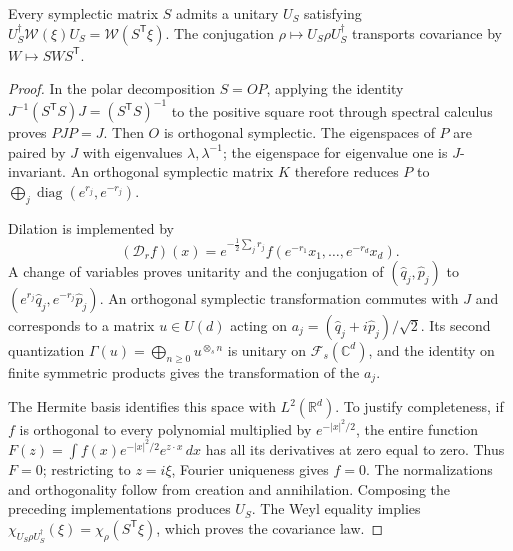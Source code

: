 \begin{lemma}
\label{md:antmem:gauss:lem:implementacion-simplectica}
Every symplectic matrix \(S\) admits a unitary \(U_S\) satisfying
\(U_S^\dagger\mathcal W(\xi)U_S=\mathcal W(S^{\mathsf T}\xi)\).
The conjugation \(\rho\mapsto U_S\rho U_S^\dagger\) transports
covariance by \(W\mapsto SWS^{\mathsf T}\).
\end{lemma}
\begin{proof}
In the polar decomposition \(S=OP\), applying the identity
\(J^{-1}(S^{\mathsf T}S)J=(S^{\mathsf T}S)^{-1}\) to the positive square root
through spectral calculus proves \(PJP=J\).
Then \(O\) is orthogonal symplectic. The eigenspaces of \(P\)
are paired by \(J\) with eigenvalues \(\lambda,\lambda^{-1}\);
the eigenspace for eigenvalue one is \(J\)-invariant. An
orthogonal symplectic matrix \(K\) therefore reduces \(P\) to
\(\bigoplus_j\operatorname{diag}(e^{r_j},e^{-r_j})\).

Dilation is implemented by
\[
 (\mathcal D_rf)(x)=e^{-\frac12\sum_jr_j}
 f(e^{-r_1}x_1,\ldots,e^{-r_d}x_d).
\]
A change of variables proves unitarity and the conjugation of
\((\widehat q_j,\widehat p_j)\) to
\((e^{r_j}\widehat q_j,e^{-r_j}\widehat p_j)\).
An orthogonal symplectic transformation commutes with \(J\) and
corresponds to a matrix \(u\in U(d)\) acting on
\(a_j=(\widehat q_j+i\widehat p_j)/\sqrt2\). Its second
quantization \(\Gamma(u)=\bigoplus_{n\geq0}u^{\otimes_s n}\)
is unitary on \(\mathcal F_s(\mathbb C^d)\), and the identity on
finite symmetric products gives the transformation of the \(a_j\).

The Hermite basis identifies this space with \(L^2(\mathbb R^d)\).
To justify completeness, if \(f\) is orthogonal to every
polynomial multiplied by \(e^{-|x|^2/2}\), the entire function
\(F(z)=\int f(x)e^{-|x|^2/2}e^{z\cdot x}\,dx\) has all its
derivatives at zero equal to zero. Thus \(F=0\); restricting to
\(z=i\xi\), Fourier uniqueness gives \(f=0\). The
normalizations and orthogonality follow from creation and annihilation.
Composing the preceding implementations produces \(U_S\).
The Weyl equality implies
\(\chi_{U_S\rho U_S^\dagger}(\xi)=\chi_\rho(S^{\mathsf T}\xi)\),
which proves the covariance law.
\end{proof}

